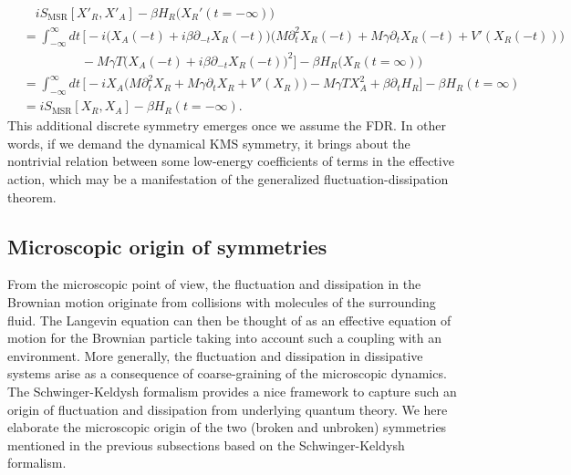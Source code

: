 \documentclass[a4paper,11pt]{article}
\begin{document}
\begin{equation}
 \begin{split}
  &\quad iS_{\textrm{MSR}} [X'_R,X'_A] - \beta H_R \big( X_R'(t=-\infty) \big) 
  \\
  &= \int_{-\infty}^{\infty} dt\, 
  \Big[ -i \big( X_A (-t) + i \beta \partial_{-t} X_R (-t) \big) 
  \big( M \partial_t^2 X_R (-t) + M\gamma \partial_t X_{R} (-t)+ V'(X_{R}(-t))
  \big)  \\
  &\hspace{55pt} 
  - M \gamma T \big( X_A (-t) + i \beta \partial_{-t} X_R (-t) \big)^2  \Big] 
  - \beta H_R \big( X_R(t=\infty) \big)
  \\
  &= \int_{-\infty}^{\infty} dt\, 
  \Big[  -i  X_A  
  \big( M \partial_t^2 X_R  + M \gamma \partial_t X_{R} + V'(X_{R}) \big)  
  - M \gamma T  X_A^2  
  + \beta \partial_t H_R \Big] 
  - \beta H_R ( t=\infty )
  \\
  &= iS_{\mathrm{MSR}} [X_R,X_A] - \beta H_R (t= -\infty).
 \end{split} 
\end{equation}
This additional discrete symmetry emerges once we assume the FDR. 
In other words, if we demand the dynamical KMS symmetry, it brings about 
the nontrivial relation between some low-energy coefficients 
of terms in the effective action, 
which may be a manifestation of the generalized fluctuation-dissipation theorem.




\subsection{Microscopic origin of symmetries}
\label{micro:origin}

From the microscopic point of view, the fluctuation and dissipation 
in the Brownian motion
originate from collisions with molecules of the surrounding fluid. 
The Langevin equation can then be thought of as an effective equation of motion 
for the Brownian particle taking into account such a coupling 
with an environment. 
More generally, the fluctuation and dissipation in dissipative systems 
 arise as a consequence of coarse-graining of 
the microscopic dynamics. 
The Schwinger-Keldysh formalism provides a nice framework 
to capture such an origin of fluctuation and dissipation 
from underlying quantum theory. 
We here elaborate the microscopic origin of the two 
(broken and unbroken) symmetries mentioned 
in the previous subsections based on the Schwinger-Keldysh formalism.
\end{document}
